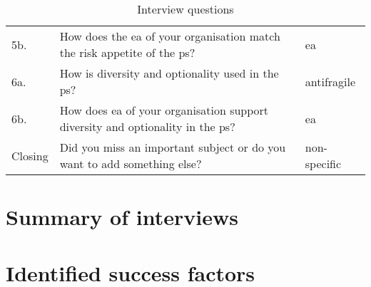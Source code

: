 \begin{table}[!h]
\begin{center}
\begin{tabular}{@{}p{}p{}p{}@{}}
				5b. & How does the \acrshort{ea} of your organisation match the risk appetite of the \gls{ps}?
				  & \acrshort{ea} \\%
				6a. & How is \gls{diversity} and \gls{optionality} used in the \gls{ps}? & \Gls{antifragile} \\%
				6b. & How does \acrshort{ea} of your organisation support \gls{diversity} and \gls{optionality} in the \gls{ps}? & \acrshort{ea} \\%
				Closing & Did you miss an important subject or do you want to add something else? & non-specific \\%
				\bottomrule
			\end{tabular}
		\caption{Interview questions}
	\end{center}
\end{table}

\section{Summary of interviews}


\section{Identified success factors}


